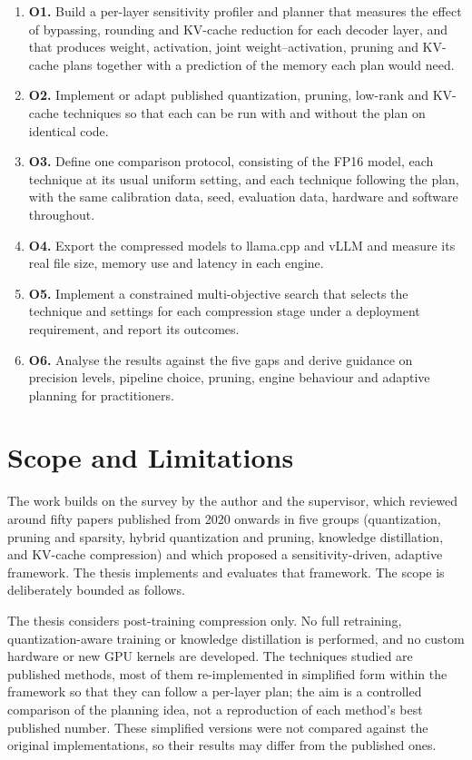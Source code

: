 \begin{enumerate}
  \item \textbf{O1.} Build a per-layer sensitivity profiler and planner that measures the effect of bypassing, rounding and KV-cache reduction for each decoder layer, and that produces weight, activation, joint weight--activation, pruning and KV-cache plans together with a prediction of the memory each plan would need.
  \item \textbf{O2.} Implement or adapt published quantization, pruning, low-rank and KV-cache techniques so that each can be run with and without the plan on identical code.
  \item \textbf{O3.} Define one comparison protocol, consisting of the FP16 model, each technique at its usual uniform setting, and each technique following the plan, with the same calibration data, seed, evaluation data, hardware and software throughout.
  \item \textbf{O4.} Export the compressed models to llama.cpp and vLLM and measure its real file size, memory use and latency in each engine.
  \item \textbf{O5.} Implement a constrained multi-objective search that selects the technique and settings for each compression stage under a deployment requirement, and report its outcomes.
  \item \textbf{O6.} Analyse the results against the five gaps and derive guidance on precision levels, pipeline choice, pruning, engine behaviour and adaptive planning for practitioners.
\end{enumerate}

\section{Scope and Limitations}
\label{sec:ch1-scope}

The work builds on the survey by the author and the supervisor, which reviewed around fifty papers published from 2020 onwards in five groups (quantization, pruning and sparsity, hybrid quantization and pruning, knowledge distillation, and KV-cache compression) and which proposed a sensitivity-driven, adaptive framework. The thesis implements and evaluates that framework. The scope is deliberately bounded as follows.

The thesis considers post-training compression only. No full retraining, quantization-aware training or knowledge distillation is performed, and no custom hardware or new GPU kernels are developed. The techniques studied are published methods, most of them re-implemented in simplified form within the framework so that they can follow a per-layer plan; the aim is a controlled comparison of the planning idea, not a reproduction of each method's best published number. These simplified versions were not compared against the original implementations, so their results may differ from the published ones.

